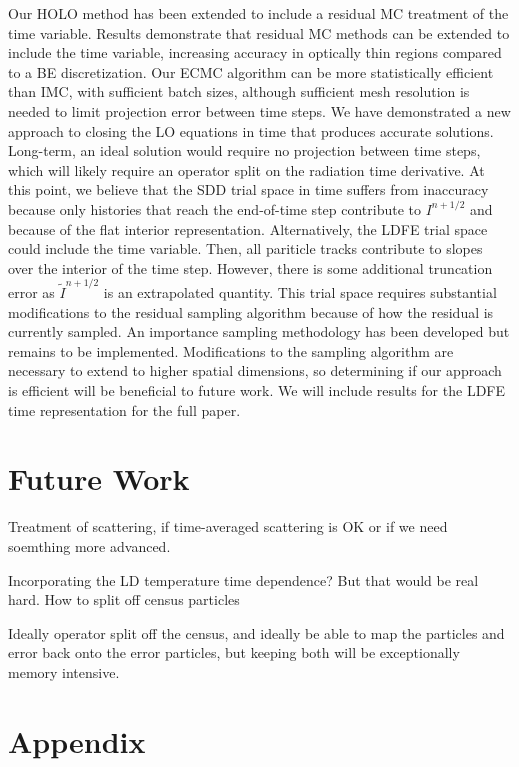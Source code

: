 \documentclass{anstrans}
\begin{document}
Our HOLO method has been extended to include a residual MC treatment of the time variable.  Results demonstrate that residual MC methods can be extended to include
the time variable, increasing accuracy in optically thin regions compared to a
BE discretization.   Our ECMC algorithm can be more statistically efficient
than IMC, with sufficient batch sizes, although sufficient mesh resolution is needed to limit projection
error between time steps.  We have demonstrated a new approach to
closing the LO equations in time that produces accurate solutions. Long-term, an ideal solution
would require no projection between time steps, which will likely require an operator split
on the radiation time derivative. At this point, we believe that the SDD trial space in time suffers from inaccuracy because
only histories that reach the end-of-time step contribute to $I^{n+1/2}$ and because of the
flat interior representation.  Alternatively, the LDFE trial space
could include the time variable.  Then, all pariticle tracks contribute to slopes over the interior of the time step.  However, there is some additional truncation
error as $\tilde I^{n+1/2}$ is an extrapolated quantity.  This trial space requires substantial modifications to the residual sampling
algorithm because of how the residual is currently sampled.  An
importance sampling methodology has been developed but remains to be implemented.  Modifications to the sampling
algorithm are necessary to extend to higher spatial dimensions, so determining if our
approach is efficient will be beneficial to future work. We will include results
for the LDFE time representation for the full paper. 

\section{Future Work}

Treatment of scattering, if time-averaged scattering is OK or if we need soemthing more advanced.

Incorporating the LD temperature time dependence? But that would be real hard.  How to split off
census particles

Ideally operator split off the census, and ideally be able to map the particles and error back onto
the error particles, but keeping both will be exceptionally memory intensive.

\appendix
\section{Appendix}
\end{document}
